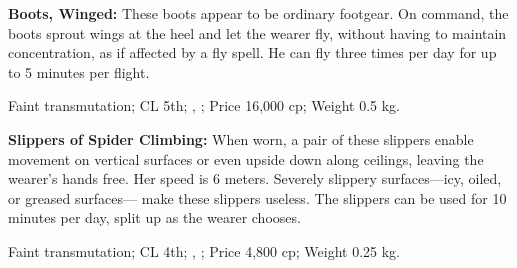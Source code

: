 
\textbf{Boots, Winged:} These boots appear to be ordinary footgear. On command, the boots sprout wings at the heel and let the wearer fly, without having to maintain concentration, as if affected by a fly spell. He can fly three times per day for up to 5 minutes per flight.

Faint transmutation; CL 5th; , ; Price 16,000 cp; Weight 0.5 kg.





\textbf{Slippers of Spider Climbing:} When worn, a pair of these slippers enable movement on vertical surfaces or even upside down along ceilings, leaving the wearer's hands free. Her speed is 6 meters. Severely slippery surfaces---icy, oiled, or greased surfaces--- make these slippers useless. The slippers can be used for 10 minutes per day, split up as the wearer chooses.

Faint transmutation; CL 4th; , ; Price 4,800 cp; Weight 0.25 kg.
